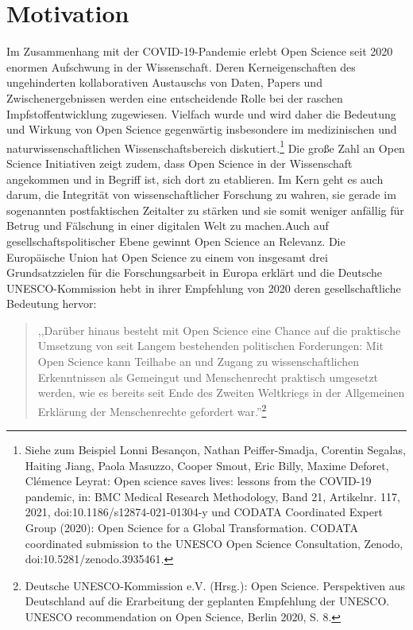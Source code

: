 \onehalfspacing

\section{Motivation}

Im Zusammenhang mit der COVID-19-Pandemie erlebt Open Science seit 2020 enormen Aufschwung in der Wissenschaft. Deren Kerneigenschaften des ungehinderten kollaborativen Austauschs von Daten, Papers und Zwischenergebnissen werden eine entscheidende Rolle bei der raschen Impfstoffentwicklung zugewiesen. Vielfach wurde und wird daher die Bedeutung und Wirkung von Open Science gegenwärtig insbesondere im medizinischen und naturwissenschaftlichen Wissenschaftsbereich diskutiert.\footnote{Siehe zum Beispiel Lonni Besançon, Nathan Peiffer-Smadja, Corentin Segalas, Haiting Jiang, Paola Masuzzo, Cooper Smout, Eric Billy, Maxime Deforet, Clémence Leyrat: Open science saves lives: lessons from the COVID-19 pandemic, in: BMC Medical Research Methodology, Band 21, Artikelnr. 117, 2021, doi:10.1186/s12874-021-01304-y und CODATA Coordinated Expert Group (2020): Open Science for a Global Transformation. CODATA coordinated submission to the UNESCO Open Science Consultation, Zenodo, doi:10.5281/zenodo.3935461.} Die große Zahl an Open Science Initiativen zeigt zudem, dass Open Science in der Wissenschaft angekommen und in Begriff ist, sich dort zu etablieren. Im Kern geht es auch darum, die Integrität von wissenschaftlicher Forschung zu wahren, sie gerade im sogenannten postfaktischen Zeitalter zu stärken und sie somit weniger anfällig für Betrug und Fälschung in einer digitalen Welt zu machen.Auch auf gesellschaftspolitischer Ebene gewinnt Open Science an Relevanz. Die Europäische Union hat Open Science zu einem von insgesamt drei Grundsatzzielen für die Forschungsarbeit in Europa erklärt und die Deutsche UNESCO-Kommission hebt in ihrer Empfehlung von 2020 deren gesellschaftliche Bedeutung hervor:

\begin{quote}     
    ,,Darüber hinaus besteht mit Open Science eine Chance auf die praktische Umsetzung von seit Langem bestehenden politischen Forderungen: Mit Open Science kann Teilhabe an und Zugang zu wissenschaftlichen Erkenntnissen als Gemeingut und Menschenrecht praktisch umgesetzt werden, wie es bereits seit Ende des Zweiten Weltkriegs in der Allgemeinen Erklärung der Menschenrechte gefordert war.''\footnote{Deutsche UNESCO-Kommission e.V. (Hrsg.): Open Science. Perspektiven aus Deutschland auf die Erarbeitung der geplanten Empfehlung der UNESCO. UNESCO recommendation on Open Science, Berlin 2020, S. 8.}    
\end{quote}

